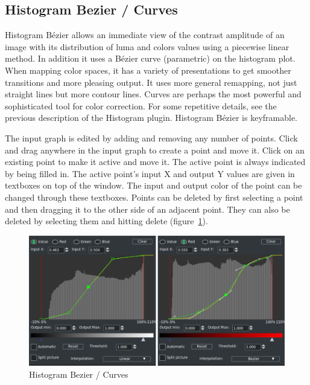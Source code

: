 \subsection{Histogram Bezier / Curves}%
\label{sub:histogram_bezier_curves}

Histogram Bézier allows an immediate view of the contrast amplitude of an image with its distribution of luma and colors values using a piecewise linear method. In addition it uses a Bézier curve (parametric) on the histogram plot. When mapping color spaces, it has a variety of presentations to get smoother transitions and more pleasing output. It uses more general remapping, not just straight lines but more contour lines. Curves are perhaps the most powerful and sophisticated tool for color correction. For some repetitive details, see the previous description of the Histogram plugin. Histogram Bézier is keyframable. 

The input graph is edited by adding and removing any number of points. Click and drag anywhere in the input graph to create a point and move it. Click on an existing point to make it active and move it. The active point is always indicated by being filled in. The active point's input X and output Y values are given in textboxes on top of the window. The input and output color of the point can be changed through these textboxes. Points can be deleted by first selecting a point and then dragging it to the other side of an adjacent point. They can also be deleted by selecting them and hitting delete (figure~\ref{fig:bezier}).

\begin{figure}[htpb]
    \centering
    \includegraphics[width=0.8\linewidth]{images/bezier.png}
    \caption{Histogram Bezier / Curves}
    \label{fig:bezier}
\end{figure}

